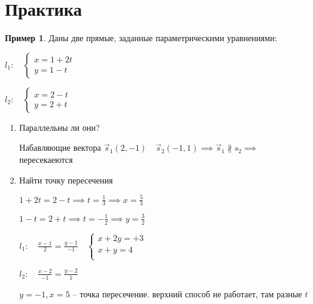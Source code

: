 \documentclass{book}
\theoremstyle{definition}
\newtheorem*{example}{Пример}
\begin{document}
\section{Практика }

\begin{example}
    Даны две прямые, заданные параметрическими уравнениями:

    $l_1:\quad \begin{cases}
        x = 1+2t\\y=1-t
    \end{cases}$ 

    $l_2:\quad \begin{cases}
        x = 2-t\\
        y = 2+t
    \end{cases}$ 

    \begin{enumerate}
        \item Параллельны ли они?

            Набавляющие вектора $\vec s_1(2, -1)\quad \vec s_2 (-1, 1) \implies \vec s_1 \not\parallel s_2 \implies $ пересекаеются
        \item Найти точку пересечения

            $1+2t=2-t \implies t = \frac{1}{3} \implies x = \frac{5}{3}$

            $1-t = 2+t \implies t = -\frac{1}{2} \implies y = \frac{3}{2}$ 

            $l_1:\quad \frac{x-1}{2} = \frac{y-1}{-1}\quad \begin{cases}
                x+2y = +3\\
                x+y = 4\\
            \end{cases}$

            $l_2:\quad \frac{x-2}{-1} = \frac{y-2}{1}$

            $y = -1, x = 5$ -- точка пересечение. верхний способ не работает, там разные  $t$
    \end{enumerate}
\end{example}
\end{document}
